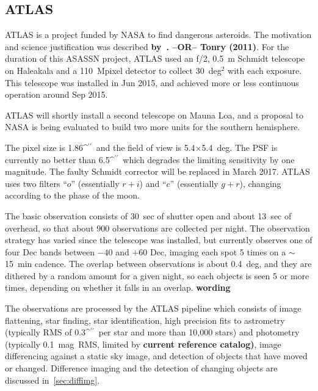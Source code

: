 \documentclass[aps,prb,twocolumn,superscriptaddress]{revtex4-1}
\def\arcsec{\ifmmode^{\prime\prime}\else$^{\prime\prime}$\fi}
\begin{document}
\subsection{ATLAS}
%
ATLAS is a project funded by NASA to find dangerous asteroids.  The
motivation and science justification was described 
{\bf by~\cite{ATLAS_data}. --OR--  Tonry (2011)}.
For the duration of this ASASSN project, ATLAS used an f/2, 0.5~m
Schmidt telescope on Haleakala and a 110~Mpixel detector to collect
30~deg$^2$ with each exposure.  This telescope was installed in Jun
2015, and achieved more or less continuous operation around Sep 2015.

ATLAS will shortly install a second telescope on Mauna Loa, and a
proposal to NASA is being evaluated to build two more units for the
southern hemisphere.

The pixel size is 1.86\arcsec\ and the field of view is
5.4$\times$5.4~deg.  The PSF is currently no better than 6.5\arcsec\
which degrades the limiting sensitivity by one magnitude.  The faulty
Schmidt corrector will be replaced in March 2017.  ATLAS uses two
filters ``$o$'' (essentially $r+i$) and ``$c$'' (essentially $g+r$),
changing according to the phase of the moon.

The basic observation consists of 30~sec of shutter open and about
13~sec of overhead, so that about 900 observations are collected per night.  
The observation strategy has varied since the telescope was
installed, but currently observes one of four Dec bands between $-40$
and $+60$ Dec, imaging each spot 5 times on a $\sim$15~min cadence.
The overlap between observations is about 0.4~deg, and they are
dithered by a random amount for a given night, so each objects is seen
5 or more times, depending on whether it falls in an overlap.
{\bf wording}

The observations are processed by the ATLAS pipeline which consists of
image flattening, star finding, star identification, high precision
fits to astrometry (typically RMS of 0.3\arcsec\ per star and more
than 10,000 stars) and photometry (typically 0.1~mag~RMS, limited by
{\bf current reference catalog)}, image differencing against a static sky
image, and detection of objects that have moved or changed.  
Difference imaging and the detection of changing objects 
are discussed in~\cref{sec:diffimg}.
\end{document}
